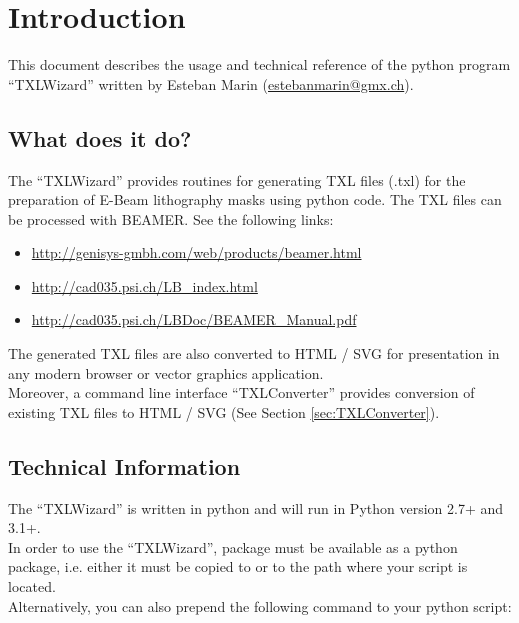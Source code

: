\section{Introduction}
    This document describes the usage and technical reference of the python program ``TXLWizard''
    written by Esteban Marin (\href{mailto:estebanmarin@gmx.ch}{estebanmarin@gmx.ch}).\\

    \subsection{What does it do?}
        The ``TXLWizard'' provides routines for generating TXL files (.txl) for
        the preparation of E-Beam lithography masks using python code. The TXL files can be processed with BEAMER.
        See the following links:
        \begin{itemize}
            \item \url{http://genisys-gmbh.com/web/products/beamer.html}
            \item \url{http://cad035.psi.ch/LB_index.html}
            \item \url{http://cad035.psi.ch/LBDoc/BEAMER_Manual.pdf}
        \end{itemize}
        The generated TXL files are also converted to HTML / SVG for presentation in any modern browser or
        vector graphics application.\\
        Moreover, a command line interface ``TXLConverter'' provides conversion of existing TXL files to HTML / SVG
        (See Section \ref{sec:TXLConverter}).


    \subsection{Technical Information}
        The ``TXLWizard'' is written in python and will run in Python version 2.7+ and 3.1+.\\
        In order to use the ``TXLWizard'', package must be available as
        a python package, i.e. either it must be copied to  or
        to the path where your script is located. \\
        Alternatively, you can also prepend the following command to your python script:\\
        \\




